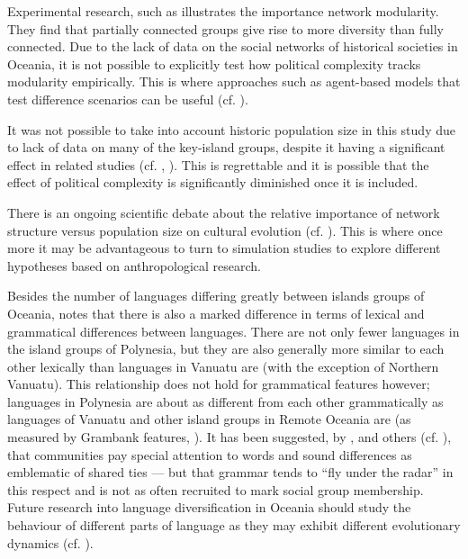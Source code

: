 \documentclass[unnumsec,webpdf,modern,medium]{oup-authoring-template}
\begin{document}
Experimental research, such as \citet{derex2016partial} illustrates the importance network modularity. They find that partially connected groups give rise to more diversity than fully connected. Due to the lack of data on the social networks of historical societies in Oceania, it is not possible to explicitly test how political complexity tracks modularity empirically. This is where approaches such as agent-based models that test difference scenarios can be useful (cf. \citet{reali2014paradox, mann2022cognition}).

It was not possible to take into account historic population size in this study due to lack of data on many of the key-island groups, despite it having a significant effect in related studies (cf. \citet{bromham_polynesian_sizes}, \citet{watts_2018}). This is regrettable and it is possible that the effect of political complexity is significantly diminished once it is included. 

There is an ongoing scientific debate about the relative importance of network structure versus population size on cultural evolution (cf. \citet{raviv2019larger, derex2016partial, milroy1992social, reali2014paradox}). This is where once more it may be advantageous to turn to simulation studies to explore different hypotheses based on anthropological research.

Besides the number of languages differing greatly between islands groups of Oceania, \citet[218-291]{skirgaard2020multilevel} notes that there is also a marked difference in terms of lexical and grammatical differences between languages. There are not only fewer languages in the island groups of Polynesia, but they are also generally more similar to each other lexically than languages in Vanuatu are (with the exception of Northern Vanuatu). This relationship does not hold for grammatical features however; languages in Polynesia are about as different from each other grammatically as languages of Vanuatu and other island groups in Remote Oceania are (as measured by Grambank features, \citep{grambank_release}). It has been suggested, by \citet{silverstein1981limits}, \citet{francois2011} and others (cf. \citet{mansfield2023dialect}), that communities pay special attention to words and sound differences as emblematic of shared ties --- but that grammar tends to ``fly under the radar'' in this respect and is not as often recruited to mark social group membership. Future research into language diversification in Oceania should study the behaviour of different parts of language as they may exhibit different evolutionary dynamics (cf. \citet{greenhilletal_2017}).
\end{document}
